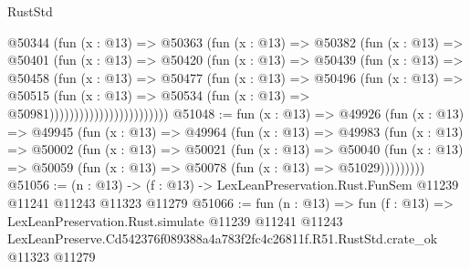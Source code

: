 \begin{lexlean}{RustStd}
\begin{coremodule}
                            @50344
                              (fun (x : @13) =>
                              @50363
                                (fun (x : @13) =>
                                @50382
                                  (fun (x : @13) =>
                                  @50401
                                    (fun (x : @13) =>
                                    @50420
                                      (fun (x : @13) =>
                                      @50439
                                        (fun (x : @13) =>
                                        @50458
                                          (fun (x : @13) =>
                                          @50477
                                            (fun (x : @13) =>
                                            @50496
                                              (fun (x : @13) =>
                                              @50515
                                                (fun (x : @13) =>
                                                @50534
                                                  (fun (x : @13) => @50981))))))))))))))))))))))))
@51048 := fun (x : @13) =>
  @49926
    (fun (x : @13) =>
    @49945
      (fun (x : @13) =>
      @49964
        (fun (x : @13) =>
        @49983
          (fun (x : @13) =>
          @50002
            (fun (x : @13) =>
            @50021
              (fun (x : @13) =>
              @50040
                (fun (x : @13) => @50059 (fun (x : @13) => @50078 (fun (x : @13) => @51029)))))))))
@51056 := (n : @13) ->
  (f : @13) -> LexLeanPreservation.Rust.FunSem @11239 @11241 @11243 @11323 @11279
@51066 := fun (n : @13) =>
  fun (f : @13) =>
  LexLeanPreservation.Rust.simulate
    @11239
    @11241
    @11243
    LexLeanPreserve.Cd542376f089388a4a783f2fc4c26811f.R51.RustStd.crate_ok
    @11323
    @11279
\end{coremodule}
\end{lexlean}
